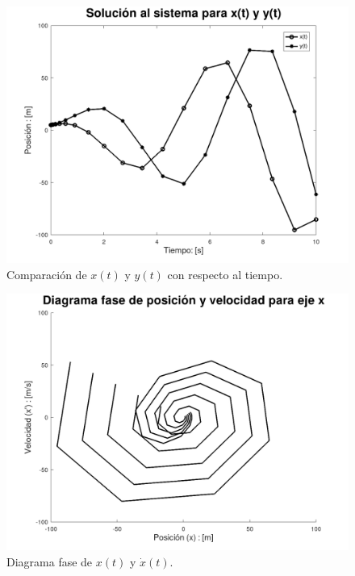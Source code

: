 \documentclass[12pt,letterpaper]{article}
\begin{document}
\begin{figure}
 \centering
 \includegraphics[scale=0.2]{img/fig03.png}
 \caption{Comparación de $x(t)$ y $y(t)$ con respecto al tiempo.}
\end{figure}

\begin{figure}
 \centering
 \includegraphics[scale=0.2]{img/fig10.png}
 \caption{Diagrama fase de $x(t)$ y $\dot{x}(t)$.}
\end{figure}
\end{document}
